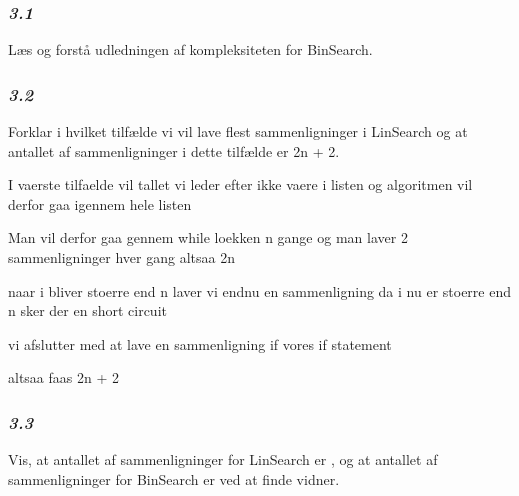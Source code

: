 \documentclass{article}
\begin{document}
\subsubsection{\textbf{\textit{3.1}}}
\begin{Maple Normal}{
Læs og forstå udledningen af kompleksiteten for BinSearch.\linebreak
}\end{Maple Normal}

\begin{Maple Normal}{
}\end{Maple Normal}
\subsubsection{\textbf{\textit{3.2}}}
\begin{Maple Normal}{
Forklar i hvilket tilfælde vi vil lave flest sammenligninger i LinSearch\linebreak
og at antallet af sammenligninger i dette tilfælde er 2n + 2.}\end{Maple Normal}

\begin{Maple Normal}{
\linebreak
I vaerste tilfaelde vil tallet vi leder efter ikke vaere i listen og algoritmen vil derfor gaa igennem hele listen}\end{Maple Normal}

\begin{Maple Normal}{
Man vil derfor gaa gennem while loekken n gange og man laver 2 sammenligninger hver gang altsaa 2n}\end{Maple Normal}

\begin{Maple Normal}{
naar i bliver stoerre end n laver vi endnu en sammenligning da i nu er stoerre end n sker der en short circuit }\end{Maple Normal}

\begin{Maple Normal}{
vi afslutter med at lave en sammenligning if vores if statement}\end{Maple Normal}

\begin{Maple Normal}{
altsaa faas 2n + 2}\end{Maple Normal}

\begin{Maple Normal}{
}\end{Maple Normal}
\subsubsection{\textbf{\textit{3.3}}}
\begin{Maple Normal}{
Vis, at antallet af sammenligninger for LinSearch er 
, og at\linebreak
antallet af sammenligninger for BinSearch er 
 ved at finde\linebreak
vidner.}\end{Maple Normal}
\end{document}
